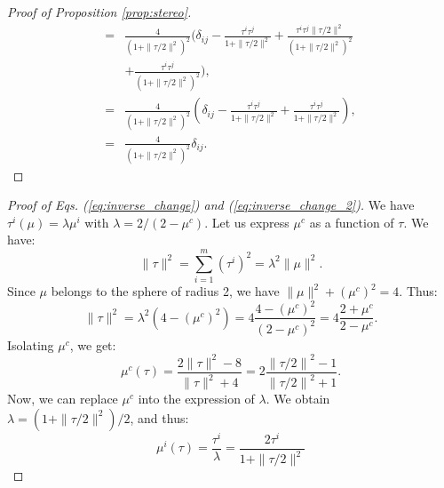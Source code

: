 \documentclass[entropy,article,submit,pdftex,moreauthors]{Definitions/mdpi}
\theoremstyle{plain}
\theoremstyle{definition}
\begin{document}
\begin{proof}[Proof of Proposition \ref{prop:stereo}]
\begin{align*}
        =& \frac{4}{\left(1+\|\tau/2\|^2\right)^2}\Biggl( \delta_{ij} - \frac{\tau^i \tau^j}{1+\|\tau/2\|^2} + \frac{\tau^i \tau^j \|\tau/2\|^2}{\left(1 + \|\tau/2\|^2\right)^2} \\
        &+ \frac{\tau^i \tau^j}{\left(1 + \|\tau/2\|^2\right)^2}\Biggl), \\
        =& \frac{4}{\left(1+\|\tau/2\|^2\right)^2}\left( \delta_{ij} - \frac{\tau^i \tau^j}{1+\|\tau/2\|^2} + \frac{\tau^i \tau^j}{1 + \|\tau/2\|^2}\right), \\
        =& \frac{4}{\left(1+\|\tau/2\|^2\right)^2} \delta_{ij}.
    \end{align*}
    \normalsize
\end{proof}

\begin{proof}[Proof of Eqs. (\ref{eq:inverse_change}) and (\ref{eq:inverse_change_2})]
    We have $\tau^i(\mu) = \lambda \mu^i$ with $\lambda = 2/\left(2-\mu^c\right)$. Let us express $\mu^c$ as a function of $\tau$. We have:
    \begin{equation*}
        \|\tau\|^2 = \sum_{i=1}^m (\tau^i)^2 = \lambda^2 \|\mu\|^2.
    \end{equation*}
    Since $\mu$ belongs to the sphere of radius 2, we have $\|\mu\|^2+(\mu^c)^2=4$. Thus:
    \begin{equation*}
         \|\tau\|^2 = \lambda^2 \left(4 - (\mu^c)^2\right) = 4\frac{4 - (\mu^c)^2}{\left(2 - \mu^c\right)^2} = 4 \frac{2 + \mu^c}{2 - \mu^c}.
    \end{equation*}
    Isolating $\mu^c$, we get:
    \begin{equation}
        \label{eq:tau-1_1}
        \mu^c(\tau) = \frac{2\|\tau\|^2-8}{\|\tau\|^2+4} = 2 \frac{\left\|\tau/2\right\|^2-1}{\left\|\tau/2\right\|^2+1}.
    \end{equation}
    Now, we can replace $\mu^c$ into the expression of $\lambda$. We obtain $\lambda = \left(1+\|\tau/2\|^2\right)/2$, and thus:
    \begin{equation}
        \label{eq:tau-1_2}
        \mu^i(\tau) = \frac{\tau^i}{\lambda} = \frac{2\tau^i}{1+\|\tau/2\|^2}
    \end{equation}
\end{proof}
\end{document}
